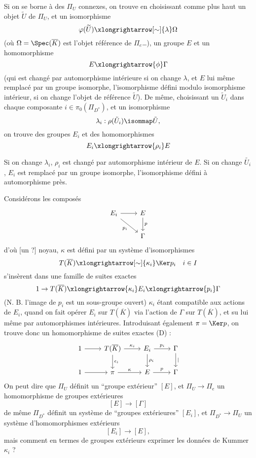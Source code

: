 Si on se borne à des $\Pi_U$ connexes, on trouve en choisissant comme plus haut un objet $\tilde{U}$ de $\Pi_U$, et un isomorphisme
$$
\varphi(\widetilde{U}) \xlongrightarrow[\sim]{\lambda} \Omega
$$
(où $\Omega = \Spec(\overline{K})$ est l'objet référence de $\Pi_e$\dots), un groupe $E$ et un homomorphisme
$$
E \xlongrightarrow{\phi} \Gamma
$$
(qui est changé par automorphisme intérieure si on change $\lambda$, et $E$ lui même remplacé par un groupe isomorphe, l'isomorphisme défini modulo isomorphisme intérieur, si on change l'objet de référence $\tilde{U}$). De même, choisissant un $\tilde{U}_i$ dans chaque composante $i \in \pi_0(\Pi_{D^*})$, et un isomorphisme
$$
\lambda_i: \rho(\tilde{U}_i) \isommap \tilde{U},
$$
on trouve des groupes $E_i$ et des homomorphismes
$$
E_i \xlongrightarrow{\rho_i} E
$$

Si on change $\lambda_i$, $\rho_i$ est changé par automorphisme intérieur de $E$. Si on change $\widetilde{U_i}$, $E_i$ est remplacé par un groupe isomorphe, l'isomorphisme défini à automorphisme près. 

Considérons les composés
\[\begin{tikzcd}
	{E_i} & E \\
	& \Gamma
	\arrow[from=1-1, to=1-2]
	\arrow["p", from=1-2, to=2-2]
	\arrow["{p_i}"', from=1-1, to=2-2]
\end{tikzcd}\]
d'où [un ?] noyau, $\kappa$ est défini par un système d'isomorphismes
$$
T(\overline{K}) \xlongrightarrow[\sim]{\kappa_i} \Ker p_i \quad i \in I
$$
s'insèrent dans une famille de suites exactes
$$
1 \to T(\overline{K}) \xlongrightarrow{\kappa_i} E_i \xlongrightarrow{p_i} \Gamma
$$
(N. B. l'image de $p_i$ est un sous-groupe ouvert) $\kappa_i$ étant compatible aux actions de $E_i$, quand on fait opérer $E_i$ sur $T(\overline{K})$ via l'action de $\Gamma$ sur $T(\overline{K})$, et su lui même par automorphismes intérieures. Introduisant également $\pi = \Ker p$, on trouve donc un homomorphisme de suites exactes (D) :
\[\begin{tikzcd}
	1 & {T(\overline{K})} & {E_i} & \Gamma \\
	1 & \pi & E & \Gamma
	\arrow[from=1-1, to=1-2]
	\arrow["{\kappa_i}", from=1-2, to=1-3]
	\arrow["{p_i}", from=1-3, to=1-4]
	\arrow["\mid", from=1-4, to=2-4]
	\arrow["{\rho_i}", from=1-3, to=2-3]
	\arrow["{\epsilon_i}", from=1-2, to=2-2]
	\arrow[from=2-1, to=2-2]
	\arrow["\kappa", from=2-2, to=2-3]
	\arrow["p", from=2-3, to=2-4]
\end{tikzcd}
\]
On peut dire que $\Pi_U$ définit un ``groupe extérieur'' $[E]$, et $\Pi_U \to \Pi_e$ un homomorphisme de groupes extérieures 
$$
[E] \to [\Gamma]
$$
de même $\Pi_{D^*}$ définit un système de ``groupes extérieures'' $[E_i]$, et $\Pi_{D^*} \to \Pi_U$ un système d'homomorphismes extérieurs
$$
[E_i] \to [E],
$$
mais comment en termes de groupes extérieurs exprimer les données de Kummer $\kappa_i$ ?

